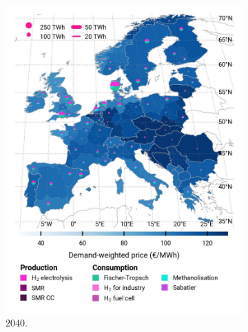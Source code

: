 \documentclass[preprint,12pt,sort&compress]{elsarticle}
\begin{document}
\begin{figure}[htbp]
\begin{subfigure}[t]{0.33\textwidth}
      \includegraphics[width=1\textwidth]{maps/no-pipelines-no-pcipmi/base_s_adm___2040-balance_map_H2}
      \caption{ 2040.}
      \label{fig:DI_lt_2040_h2}
  \end{subfigure}
  \begin{subfigure}[t]{0.33\textwidth}
    \vspace{0pt}

\end{subfigure}
\end{figure}
\end{document}
